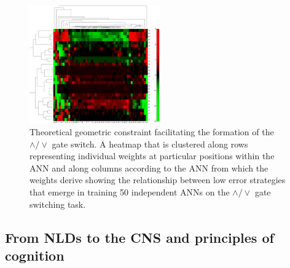 \begin{figure}
\begin{center}
\includegraphics[width=0.5\textwidth]{../fig/dendrogram.pdf}
\end{center}
\caption{Theoretical geometric constraint facilitating the formation of the $\wedge / \vee$ gate switch. A heatmap that is clustered along rows representing individual weights at particular positions within the ANN and along columns according to the ANN from which the weights derive showing the relationship between low error strategies that emerge in training 50 independent ANNs on the $\wedge / \vee$ gate switching task.}\label{fig:nnDendro}
\end{figure}


\subsection{From NLDs to the CNS and principles of cognition}

